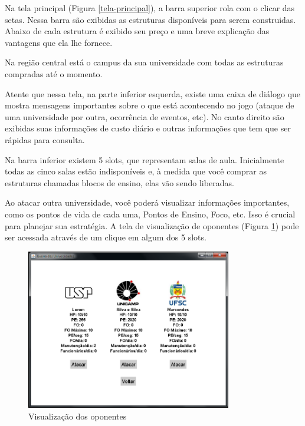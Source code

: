 \documentclass[brazil,times]{abnt}
\begin{document}
Na tela principal (Figura \ref{tela-principal}), a barra superior rola com o
clicar das setas. Nessa barra são exibidas as estruturas disponíveis para serem
construidas. Abaixo de cada estrutura é exibido seu preço e uma breve
explicação das vantagens que ela lhe fornece.

Na região central está o campus da sua universidade com todas as estruturas
compradas até o momento.

Atente que nessa tela, na parte inferior esquerda, existe uma caixa de diálogo
que mostra mensagens importantes sobre o que está acontecendo no jogo (ataque de uma
universidade por outra, ocorrência de eventos, etc). No canto direito são
exibidas suas informações de custo diário e outras informações que tem que ser
rápidas para consulta.

Na barra inferior existem 5 slots, que representam salas de aula. Inicialmente
todas as cinco salas estão indisponíveis e, à medida que você comprar as
estruturas chamadas blocos de ensino, elas vão sendo liberadas.

Ao atacar outra universidade, você poderá visualizar informações importantes,
como os pontos de vida de cada uma, Pontos de Ensino, Foco, etc. Isso é crucial
para planejar sua estratégia. A tela de visualização de oponentes (Figura
\ref{visualizar-oponentes}) pode ser acessada através de um clique em algum dos
5 slots. 

\begin{figure}[htp]
\begin{center}
  \includegraphics[width=0.8\textwidth]{img/Figura5manual.PNG}
  \caption[Visualização dos oponentes]{Visualização dos oponentes}
  \label{visualizar-oponentes}
\end{center}
\end{figure}
\end{document}
